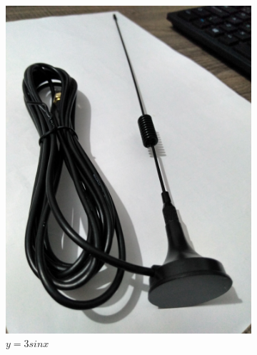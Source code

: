 \documentclass[
  12pt,				%
  openright,			%
  twoside,			%
  a4paper,			%
  english,			%
  french,				%
  spanish,			%
  brazil,				%
  ]{abntex2}
\begin{document}
\begin{figure}[ht]
\begin{subfigure}[b]{0.45\linewidth}
    \includegraphics[width=\linewidth]{figures/hackrf/hack_rf_antena_helicoidal.jpg}
    \caption{$y=3sinx$}
    \label{fig:hack_rf_antena_helicoidal}
  \end{subfigure}
  \quad
  \begin{subfigure}[b]{0.45\linewidth}
    \centering

\end{subfigure}
\end{figure}
\end{document}
